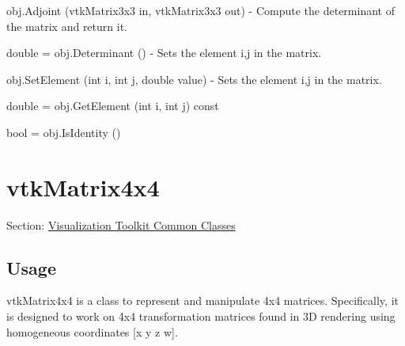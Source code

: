 \begin{DoxyItemize}
\item {\ttfamily obj.\-Adjoint (vtk\-Matrix3x3 in, vtk\-Matrix3x3 out)} -\/ Compute the determinant of the matrix and return it.  
\item {\ttfamily double = obj.\-Determinant ()} -\/ Sets the element i,j in the matrix.  
\item {\ttfamily obj.\-Set\-Element (int i, int j, double value)} -\/ Sets the element i,j in the matrix.  
\item {\ttfamily double = obj.\-Get\-Element (int i, int j) const}  
\item {\ttfamily bool = obj.\-Is\-Identity ()}  
\end{DoxyItemize}\hypertarget{vtkcommon_vtkmatrix4x4}{}\section{vtk\-Matrix4x4}\label{vtkcommon_vtkmatrix4x4}
Section\-: \hyperlink{sec_vtkcommon}{Visualization Toolkit Common Classes} \hypertarget{vtkwidgets_vtkxyplotwidget_Usage}{}\subsection{Usage}\label{vtkwidgets_vtkxyplotwidget_Usage}
vtk\-Matrix4x4 is a class to represent and manipulate 4x4 matrices. Specifically, it is designed to work on 4x4 transformation matrices found in 3\-D rendering using homogeneous coordinates \mbox{[}x y z w\mbox{]}.

